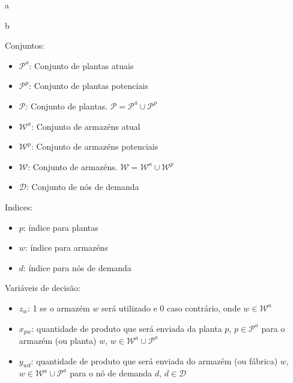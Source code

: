 \documentclass[12pt,a4paper]{article}
\begin{document}
a

b

Conjuntos:

\begin{itemize}
    \item $\mathcal{P}^{a}$: Conjunto de plantas atuais
    \item $\mathcal{P}^{p}$: Conjunto de plantas potenciais
    \item $\mathcal{P}$: Conjunto de plantas. $\mathcal{P} = \mathcal{P}^{a} \cup \mathcal{P}^{p}$
    \item $\mathcal{W}^{a}$: Conjunto de armazéns atual
    \item $\mathcal{W}^{p}$: Conjunto de armazéns potenciais
    \item $\mathcal{W}$: Conjunto de armazéns. $\mathcal{W} = \mathcal{W}^{a} \cup \mathcal{W}^{p}$
    \item $\mathcal{D}$: Conjunto de nós de demanda
\end{itemize}

Indices:

\begin{itemize}
    \item $p$: índice para plantas
    \item $w$: índice para armazéns
    \item $d$: índice para nós de demanda
\end{itemize}


Variáveis de decisão:

\begin{itemize}
    \item $z_{w}$: 1 se o armazém $w$ será utilizado e 0 caso contrário, onde $w \in \mathcal{W}^{a}$
    \item $x_{pw}$: quantidade de produto que será enviada da planta $p$, $p \in \mathcal{P}^{a}$ para o armazém (ou planta) $w$, $w \in \mathcal{W}^{a} \cup \mathcal{P}^{a}$
    \item $y_{wd}$: quantidade de produto que será enviada do armazém (ou fábrica) $w$, $w \in \mathcal{W}^{a} \cup \mathcal{P}^{a}$ para o nó de demanda $d$, $d \in \mathcal{D}$
\end{itemize}
\end{document}
